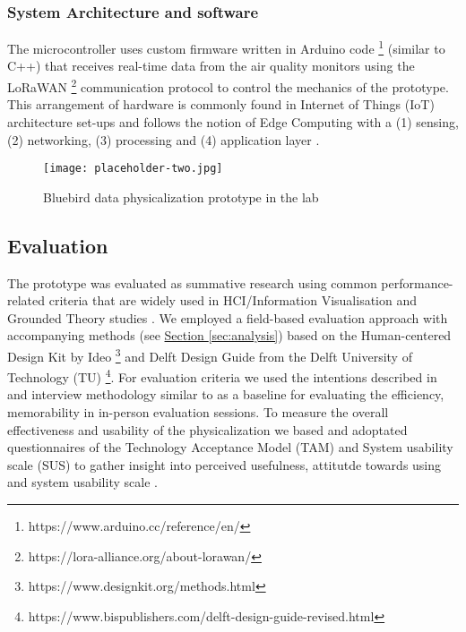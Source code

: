\subsubsection{System Architecture and software}

The microcontroller uses custom firmware written in Arduino code \footnote{https://www.arduino.cc/reference/en/} (similar to C++) that receives real-time data from the air quality monitors using the LoRaWAN \footnote{https://lora-alliance.org/about-lorawan/} communication protocol to control the mechanics of the prototype. This arrangement of hardware is commonly found in Internet of Things (IoT) architecture set-ups and follows the notion of Edge Computing with a (1) sensing, (2) networking, (3) processing and (4) application layer \cite{li_edge-oriented_2019, idrees_edge_2018}.

\begin{figure}[!h]
    \centering
    \texttt{[image: placeholder-two.jpg]}
    \caption{Bluebird data physicalization prototype in the lab}
    \label{fig:complexity}
\end{figure}

\subsection{Evaluation}

The prototype was evaluated as summative research using common performance-related criteria that are widely used in HCI/Information Visualisation \cite{ranasinghe_encoding_2023} and Grounded Theory studies \cite{chun_tie_grounded_2019}. We employed a field-based evaluation approach with accompanying methods (see \hyperref[sec:analysis]{Section \ref*{sec:analysis}}) based on the Human-centered Design Kit by Ideo \footnote{https://www.designkit.org/methods.html} and Delft Design Guide from the Delft University of Technology (TU) \footnote{https://www.bispublishers.com/delft-design-guide-revised.html}. For evaluation criteria we used the intentions described in \cite{ranasinghe_encoding_2023} and interview methodology similar to \cite{jansen_evaluating_2013} as a baseline for evaluating the efficiency, memorability in in-person evaluation sessions. To measure the overall effectiveness and usability of the physicalization we based and adoptated questionnaires of the Technology Acceptance Model (TAM) and System usability scale (SUS) to gather insight into perceived usefulness, attitutde towards using and system usability scale \cite{davis_perceived_1989, brooke_sus_1996}. 

